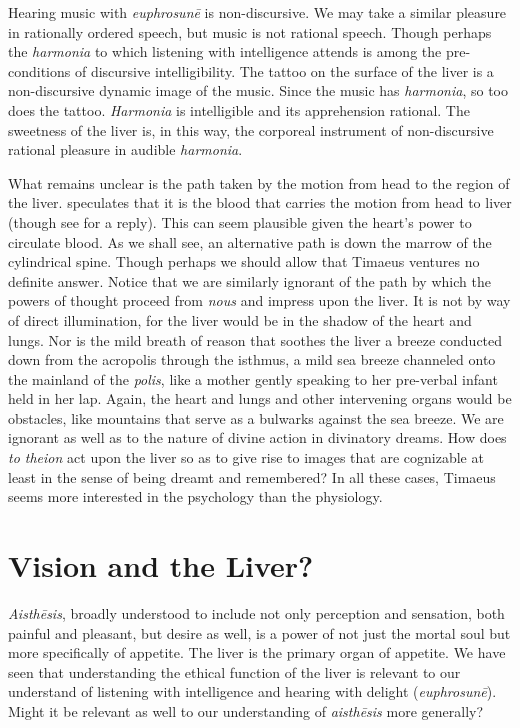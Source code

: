 Hearing music with \emph{euphrosunē} is non-discursive. We may take a similar pleasure in rationally ordered speech, but music is not rational speech. Though perhaps the \emph{harmonia} to which listening with intelligence attends is among the pre-conditions of discursive intelligibility. The tattoo on the surface of the liver is a non-discursive dynamic image of the music. Since the music has \emph{harmonia}, so too does the tattoo. \emph{Harmonia} is intelligible and its apprehension rational. The sweetness of the liver is, in this way, the corporeal instrument of non-discursive rational pleasure in audible \emph{harmonia}.

What remains unclear is the path taken by the motion from head to the region of the liver. \citet{Brisson:1997qr} speculates that it is the blood that carries the motion from head to liver (though see \citealt{Miller:1997up} for a reply). This can seem plausible given the heart's power to circulate blood. As we shall see, an alternative path is down the marrow of the cylindrical spine. Though perhaps we should allow that Timaeus ventures no definite answer. Notice that we are similarly ignorant of the path by which the powers of thought proceed from \emph{nous} and impress upon the liver. It is not by way of direct illumination, for the liver would be in the shadow of the heart and lungs. Nor is the mild breath of reason that soothes the liver a breeze conducted down from the acropolis through the isthmus, a mild sea breeze channeled onto the mainland of the \emph{polis}, like a mother gently speaking to her pre-verbal infant held in her lap. Again, the heart and lungs and other intervening organs would be obstacles, like mountains that serve as a bulwarks against the sea breeze. We are ignorant as well as to the nature of divine action in divinatory dreams. How does \emph{to theion} act upon the liver so as to give rise to images that are cognizable at least in the sense of being dreamt and remembered? In all these cases, Timaeus seems more interested in the psychology than the physiology.


\section{Vision and the Liver?} %
\label{sec:vision_and_the_liver}

\emph{Aisthēsis}, broadly understood to include not only perception and sensation, both painful and pleasant, but desire as well, is a power of not just the mortal soul but more specifically of appetite. The liver is the primary organ of appetite. We have seen that understanding the ethical function of the liver is relevant to our understand of listening with intelligence and hearing with delight (\emph{euphrosunē}). Might it be relevant as well to our understanding of \emph{aisthēsis} more generally?

